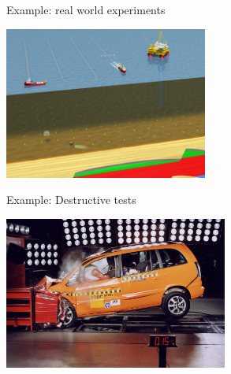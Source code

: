 \documentclass{beamer}
\begin{document}
\begin{frame}{}
\begin{exampleblock}{Example: real world experiments}
\begin{center}
\includegraphics[height=5cm]{figures/drilling}
\end{center}
\end{exampleblock}
\end{frame}

\begin{frame}{}
\begin{exampleblock}{Example: Destructive tests}
\begin{center}
\includegraphics[height=5cm]{figures/crash-test}
\end{center}
\end{exampleblock}
\end{frame}
\end{document}
